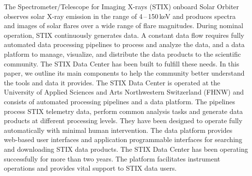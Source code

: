 \documentclass[referee]{preaa} %
\begin{document}
  \abstract
   {The Spectrometer/Telescope for Imaging X-rays (STIX) onboard Solar Orbiter observes solar X-ray emission in the range of 4\,--\,150\,keV and produces spectra and images of solar flares over a wide range of flare magnitudes.  During nominal operation, STIX continuously generates data. 
   A constant data flow requires fully automated data processing pipelines to process and analyze the data, and a data platform to manage, visualize, and distribute the data products to the scientific community.  
   } %
   {The STIX Data Center has been built to fulfill these needs.  In this paper, we outline its main components to help the community better understand the tools and data it provides.
   }
   {
   The STIX Data Center is operated at the University of Applied Sciences and Arts Northwestern Switzerland (FHNW) and consists of automated processing pipelines and a data platform.  The pipelines process STIX telemetry data, perform common analysis tasks and generate data products at different processing levels. They have been designed to operate fully automatically with minimal human intervention.  The data platform provides web-based user interfaces and application programmable interfaces for searching and downloading STIX data products.
   }
   {
   The STIX Data Center has been operating successfully for more than two years. The platform facilitates instrument operations and provides vital support to STIX data users.}
 {}
   \maketitle

\end{document}
